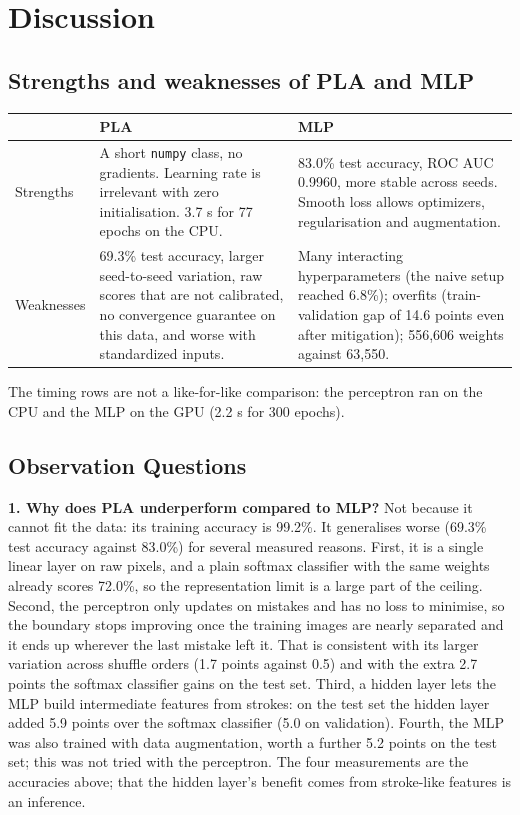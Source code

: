 \documentclass[12pt,a4paper]{article}
\begin{document}
\section{Discussion}

\subsection*{Strengths and weaknesses of PLA and MLP}
\begin{longtable}{p{2.3cm}p{5.9cm}p{6.2cm}}
\toprule
 & PLA & MLP \\
\midrule
Strengths & A short \texttt{numpy} class, no gradients. Learning rate is irrelevant with zero
initialisation. 3.7 s for 77 epochs on the CPU. & 83.0\%
test accuracy, ROC AUC 0.9960, more stable across seeds. Smooth loss allows
optimizers, regularisation and augmentation. \\
Weaknesses & 69.3\% test accuracy, larger seed-to-seed variation, raw
scores that are not calibrated, no convergence guarantee on this data, and worse with standardized
inputs. & Many interacting hyperparameters (the naive setup reached 6.8\%); overfits
(train-validation gap of 14.6 points even after mitigation);
556,606 weights against 63,550. \\
\bottomrule
\end{longtable}
The timing rows are not a like-for-like comparison: the perceptron ran on the CPU and the MLP on the
GPU (2.2 s for 300 epochs).

\subsection*{Observation Questions}
\textbf{1. Why does PLA underperform compared to MLP?} Not because it cannot fit the data: its
training accuracy is 99.2\%. It generalises worse
(69.3\% test accuracy against 83.0\%) for
several measured reasons. First, it is a single linear layer on raw pixels, and a plain softmax
classifier with the same weights already scores 72.0\%, so the
representation limit is a large part of the ceiling. Second, the perceptron only updates on mistakes
and has no loss to minimise, so the boundary stops improving once the training images are
nearly separated and it ends up wherever the last mistake left it. That is consistent with its larger
variation across shuffle orders (1.7 points against
0.5) and with the extra 2.7
points the softmax classifier gains on the test set. Third, a hidden layer lets the MLP build
intermediate features from strokes: on the test set the hidden layer added
5.9 points over the softmax
classifier (5.0 on validation). Fourth, the MLP was also trained
with data augmentation, worth a further 5.2
points on the test set; this was not tried with the perceptron. The four measurements are the
accuracies above; that the hidden layer's benefit comes from stroke-like features is an inference.
\end{document}
